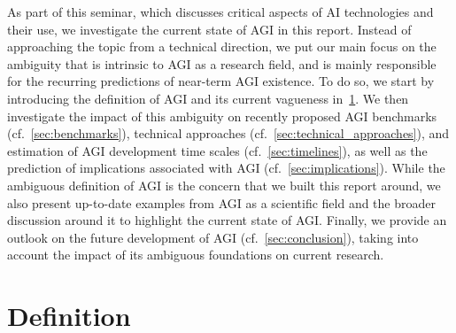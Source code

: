 As part of this seminar, which discusses critical aspects of AI technologies and their use, we investigate the current state of AGI in this report.
Instead of approaching the topic from a technical direction, we put our main focus on the ambiguity that is intrinsic to AGI as a research field, and is mainly responsible for the recurring predictions of near-term AGI existence.
To do so, we start by introducing the definition of AGI and its current vagueness in~\cref{sec:definition}.
We then investigate the impact of this ambiguity on recently proposed AGI benchmarks (cf.~\cref{sec:benchmarks}), technical approaches (cf.~\cref{sec:technical_approaches}), and estimation of AGI development time scales (cf.~\cref{sec:timelines}), as well as the prediction of implications associated with AGI (cf.~\cref{sec:implications}).
While the ambiguous definition of AGI is the concern that we built this report around, we also present up-to-date examples from AGI as a scientific field and the broader discussion around it to highlight the current state of AGI.
Finally, we provide an outlook on the future development of AGI (cf.~\cref{sec:conclusion}), taking into account the impact of its ambiguous foundations on current research.

\section{Definition}\label{sec:definition}


